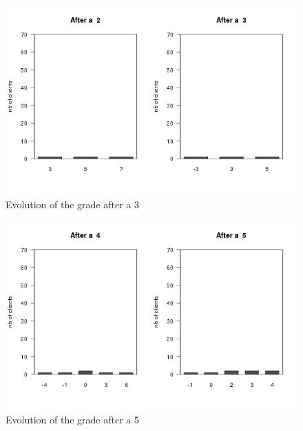 \documentclass[a4paper, 11pt]{article}
\begin{document}
        \begin{figure}[!ht]
                \centering
                \includegraphics[height = 10 cm]{Remi/Evolution_of_the_grade_after_a_3.png}
                \caption{Evolution of the grade after a 3}
                \label{fig:e_3}
        \end{figure}

        \begin{figure}[!ht]
                \centering
                \includegraphics[height = 10 cm]{Remi/Evolution_of_the_grade_after_a_5.png}
                \caption{Evolution of the grade after a 5}
                \label{fig:e_5}
        \end{figure}
\end{document}
